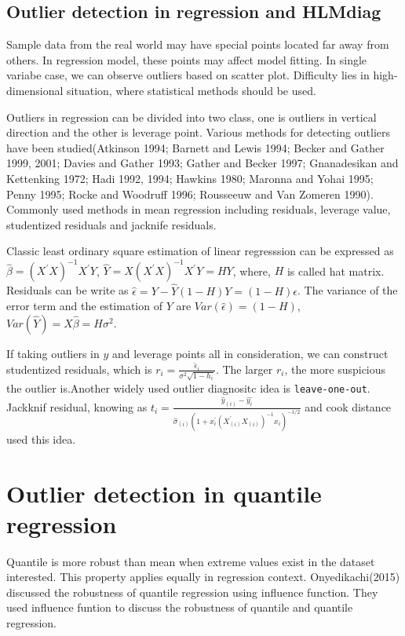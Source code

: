 \documentclass[11pt,a4paper,]{article}
\theoremstyle{definition}
\theoremstyle{definition}
\theoremstyle{remark}
\begin{document}
\subsection{Outlier detection in regression and
HLMdiag}\label{outlier-detection-in-regression-and-hlmdiag}

Sample data from the real world may have special points located far away
from others. In regression model, these points may affect model fitting.
In single variabe case, we can observe outliers based on scatter plot.
Difficulty lies in high-dimensional situation, where statistical methods
should be used.

Outliers in regression can be divided into two class, one is outliers in
vertical direction and the other is leverage point. Various methods for
detecting outliers have been studied(Atkinson 1994; Barnett and Lewis
1994; Becker and Gather 1999, 2001; Davies and Gather 1993; Gather and
Becker 1997; Gnanadesikan and Kettenking 1972; Hadi 1992, 1994; Hawkins
1980; Maronna and Yohai 1995; Penny 1995; Rocke and Woodruff 1996;
Rousseeuw and Van Zomeren 1990). Commonly used methods in mean
regression including residuals, leverage value, studentized residuals
and jacknife residuals.

Classic least ordinary square estimation of linear regresssion can be
expressed as \(\hat{\beta}=(X^{'}X)^{-1}X^{'}Y\),
\(\hat{Y}=X(X^{'}X)^{-1}X^{'}Y=HY\), where, \(H\) is called hat matrix.
Residuals can be write as
\(\hat{\epsilon}=Y-\hat{Y}(1-H)Y=(1-H)\epsilon\). The variance of the
error term and the estimation of \(Y\) are
\(Var(\hat{\epsilon})=(1-H)\),
\(Var(\hat{Y})=X\hat{\beta}=H\sigma^{2}\).

If taking outliers in \(y\) and leverage points all in consideration, we
can construct studentized residuals, which is
\(r_i=\frac{\hat{\epsilon}_{i}}{\sigma^{2}\sqrt{1-h_i}}\). The larger
\(r_i\), the more suspicious the outlier is.Another widely used outlier
diagnositc idea is \texttt{leave-one-out}. Jackknif residual, knowing as
\(t_i=\frac{\hat{y}_{(i)}-\hat{y_i}}{\hat{\sigma}_{(i)}(1+x^{'}_{i}(X^{'}_{(i)}X_{(i)})^{-1}x_{i})^{-1/2}}\)
and cook distance used this idea.

\section{Outlier detection in quantile
regression}\label{outlier-detection-in-quantile-regression}

Quantile is more robust than mean when extreme values exist in the
dataset interested. This property applies equally in regression context.
Onyedikachi(2015) discussed the robustness of quantile regression using
influence function. They used influence funtion to discuss the
robustness of quantile and quantile regression.
\end{document}
